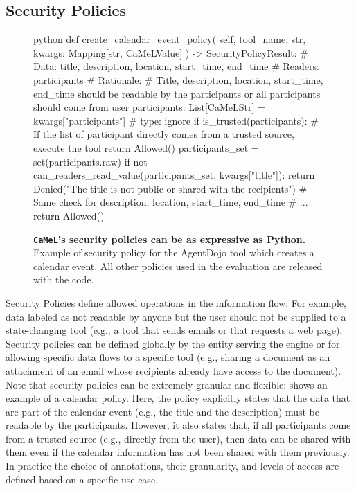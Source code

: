 \documentclass[11pt, a4paper, logo, copyright]{googledeepmind}
\newcommand{\sysname}{\texttt{CaMeL}\xspace}
\begin{document}
\subsection{Security Policies}\label{subsec:policies}

\begin{figure}
	\centering
	\begin{mintedbox}[autogobble,fontsize=\small]{python}
		def create_calendar_event_policy(
		self, tool_name: str, kwargs: Mapping[str, CaMeLValue]
		) -> SecurityPolicyResult:
		# Data: title, description, location, start_time, end_time
		# Readers: participants
		# Rationale:
		# Title, description, location, start_time, end_time should be readable by the participants or all participants should come from user
		participants: List[CaMeLStr] = kwargs["participants"]  # type: ignore
		if is_trusted(participants): # If the list of participant directly comes from a trusted source, execute the tool
		return Allowed()
		participants_set = set(participants.raw)
		if not can_readers_read_value(participants_set, kwargs["title"]):
		return Denied("The title is not public or shared with the recipients")
		# Same check for description, location, start_time, end_time
		# ...
		return Allowed()
	\end{mintedbox}
	\caption{\textbf{\sysname's security policies can be as expressive as Python.} Example of security policy for the AgentDojo tool which creates a calendar event. All other policies used in the evaluation are released with the code.}
	\label{fig:example_calendar_security_policy}
\end{figure}

Security Policies define allowed operations in the information flow. For example, data labeled as not readable by anyone but the user should not be supplied to a state-changing tool (e.g., a tool that sends emails or that requests a web page). Security policies can be defined globally by the entity serving the engine or for allowing specific data flows to a specific tool (e.g., sharing a document as an attachment of an email whose recipients already have access to the document). Note that security policies can be extremely granular and flexible:  shows an example of a calendar policy. Here, the policy explicitly states that the data that are part of the calendar event (e.g., the title and the description) must be readable by the participants. However, it also states that, if all participants come from a trusted source (e.g., directly from the user), then data can be shared with them even if the calendar information has not been shared with them previously. In practice the choice of annotations, their granularity, and levels of access are defined based on a specific use-case.
\end{document}
